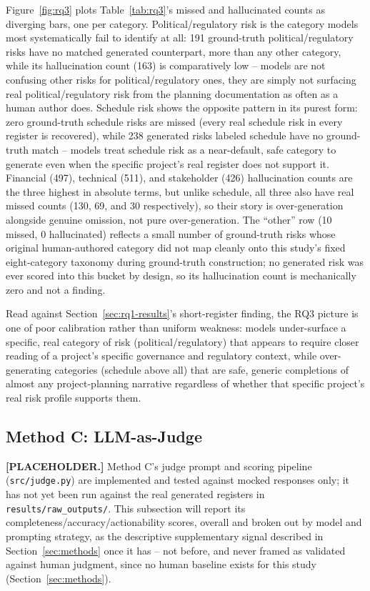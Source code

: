 \documentclass[conference]{IEEEtran}
\begin{document}
Figure~\ref{fig:rq3} plots Table~\ref{tab:rq3}'s missed and hallucinated
counts as diverging bars, one per category. Political/regulatory risk is
the category models most systematically fail
to identify at all: 191 ground-truth political/regulatory risks have no
matched generated counterpart, more than any other category, while its
hallucination count (163) is comparatively low -- models are not confusing
other risks for political/regulatory ones, they are simply not surfacing
real political/regulatory risk from the planning documentation as often as
a human author does. Schedule risk shows the opposite pattern in its purest
form: zero ground-truth schedule risks are missed (every real schedule risk
in every register is recovered), while 238 generated risks labeled schedule
have no ground-truth match -- models treat schedule risk as a near-default,
safe category to generate even when the specific project's real register
does not support it. Financial (497), technical (511), and stakeholder
(426) hallucination counts are the three highest in absolute terms, but
unlike schedule, all three also have real missed counts (130, 69, and 30
respectively), so their story is over-generation alongside genuine
omission, not pure over-generation. The ``other'' row (10 missed, 0
hallucinated) reflects a small number of ground-truth risks whose original
human-authored category did not map cleanly onto this study's fixed
eight-category taxonomy during ground-truth construction; no generated risk
was ever scored into this bucket by design, so its hallucination count is
mechanically zero and not a finding.

Read against Section~\ref{sec:rq1-results}'s short-register finding, the
RQ3 picture is one of poor calibration rather than uniform weakness:
models under-surface a specific, real category of risk
(political/regulatory) that appears to require closer reading of a
project's specific governance and regulatory context, while over-generating
categories (schedule above all) that are safe, generic completions of
almost any project-planning narrative regardless of whether that
specific project's real risk profile supports them.

\subsection{Method C: LLM-as-Judge}
\textbf{[PLACEHOLDER.]} Method C's judge prompt and scoring pipeline
(\texttt{src/judge.py}) are implemented and tested against mocked responses
only; it has not yet been run against the real generated registers in
\texttt{results/raw\_outputs/}. This subsection will report its
completeness/accuracy/actionability scores, overall and broken out by
model and prompting strategy, as the descriptive supplementary signal
described in Section~\ref{sec:methods} once it has -- not before, and never
framed as validated against human judgment, since no human baseline exists
for this study (Section~\ref{sec:methods}).
\end{document}
